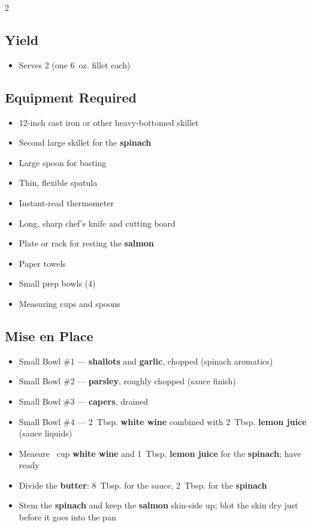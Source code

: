 \documentclass[11pt,letterpaper]{article}
\begin{document}
\newpage

{\footnotesize
\setlength{\columnsep}{20pt}
\setlength{\multicolsep}{6pt}
\begin{multicols}{2}
\setlength{\parindent}{0pt}
\setlength{\parskip}{2pt}
\setlength{\itemsep}{0pt}
\setlength{\parsep}{0pt}

\subsection*{Yield}
\begin{itemize}
    \item Serves 2 (one 6~oz. fillet each)
\end{itemize}

\subsection*{Equipment Required}
\begin{itemize}
    \item 12-inch cast iron or other heavy-bottomed skillet
    \item Second large skillet for the \textbf{spinach}
    \item Large spoon for basting
    \item Thin, flexible spatula
    \item Instant-read thermometer
    \item Long, sharp chef's knife and cutting board
    \item Plate or rack for resting the \textbf{salmon}
    \item Paper towels
    \item Small prep bowls (4)
    \item Measuring cups and spoons
\end{itemize}

\subsection*{Mise en Place}
\begin{itemize}
    \item Small Bowl \#1 --- \textbf{shallots} and \textbf{garlic}, chopped (spinach aromatics)
    \item Small Bowl \#2 --- \textbf{parsley}, roughly chopped (sauce finish)
    \item Small Bowl \#3 --- \textbf{capers}, drained
    \item Small Bowl \#4 --- 2~Tbsp. \textbf{white wine} combined with 2~Tbsp. \textbf{lemon juice} (sauce liquids)
    \item Measure ~cup \textbf{white wine} and 1~Tbsp. \textbf{lemon juice} for the \textbf{spinach}; have ready
    \item Divide the \textbf{butter}: 8~Tbsp. for the sauce, 2~Tbsp. for the \textbf{spinach}
    \item Stem the \textbf{spinach} and keep the \textbf{salmon} skin-side up; blot the skin dry just before it goes into the pan
\end{itemize}


\end{multicols}}
\end{document}
